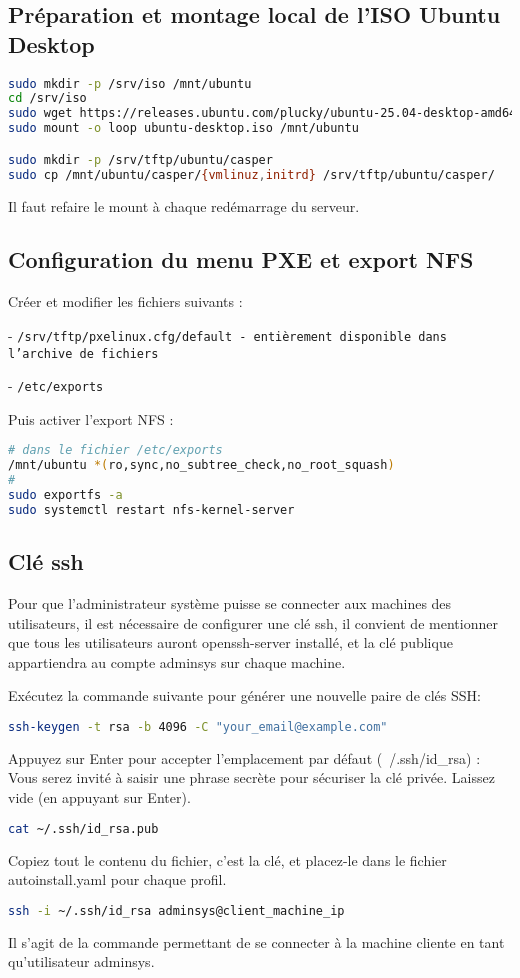 \documentclass[a4paper,12pt]{article}
\begin{document}
\subsection{Préparation et montage local de l'ISO Ubuntu Desktop}

\begin{lstlisting}[language=bash]
sudo mkdir -p /srv/iso /mnt/ubuntu
cd /srv/iso
sudo wget https://releases.ubuntu.com/plucky/ubuntu-25.04-desktop-amd64.iso -O ubuntu-desktop.iso
sudo mount -o loop ubuntu-desktop.iso /mnt/ubuntu 

sudo mkdir -p /srv/tftp/ubuntu/casper
sudo cp /mnt/ubuntu/casper/{vmlinuz,initrd} /srv/tftp/ubuntu/casper/
\end{lstlisting}
Il faut refaire le mount à chaque redémarrage du serveur.

\subsection{Configuration du menu PXE et export NFS}

Créer et modifier les fichiers suivants :

- \texttt{/srv/tftp/pxelinux.cfg/default - entièrement disponible dans l'archive de fichiers}

- \texttt{/etc/exports}

Puis activer l’export NFS :

\begin{lstlisting}[language=bash]
# dans le fichier /etc/exports
/mnt/ubuntu *(ro,sync,no_subtree_check,no_root_squash)
#
sudo exportfs -a
sudo systemctl restart nfs-kernel-server
\end{lstlisting}

\subsection{Clé ssh}
Pour que l'administrateur système puisse se connecter aux machines des utilisateurs, il est nécessaire de configurer une clé ssh, il convient de mentionner que tous les utilisateurs auront openssh-server installé, et la clé publique appartiendra au compte adminsys sur chaque machine.

\newline
Exécutez la commande suivante pour générer une nouvelle paire de clés SSH:
\begin{lstlisting}[language=bash]
ssh-keygen -t rsa -b 4096 -C "your_email@example.com"
\end{lstlisting}
Appuyez sur Enter pour accepter l'emplacement par défaut (~/.ssh/id\_rsa)
:
Vous serez invité à saisir une phrase secrète pour sécuriser la clé privée. Laissez vide (en appuyant sur Enter).
\begin{lstlisting}[language=bash]
cat ~/.ssh/id_rsa.pub
\end{lstlisting}
Copiez tout le contenu du fichier, c'est la clé, et placez-le dans le fichier autoinstall.yaml pour chaque profil.
\begin{lstlisting}[language=bash]
ssh -i ~/.ssh/id_rsa adminsys@client_machine_ip
\end{lstlisting}
Il s'agit de la commande permettant de se connecter à la machine cliente en tant qu'utilisateur adminsys.
\end{document}
